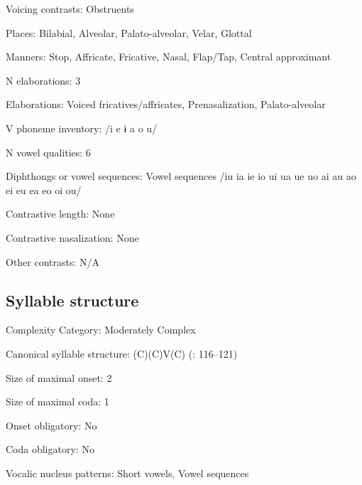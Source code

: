{\begin{appendixdesc}
\item[Voicing contrasts:] Obstruents

\item[Places:] Bilabial, Alveolar, Palato-alveolar, Velar, Glottal

\item[Manners:] Stop, Affricate, Fricative, Nasal, Flap/Tap, Central approximant

\item[N elaborations:] 3

\item[Elaborations:] Voiced fricatives/affricates, Prenasalization, Palato-alveolar

\item[V phoneme inventory:] /i e ɨ a o u/

\item[N vowel qualities:] 6

\item[Diphthongs or vowel sequences:] Vowel sequences /iu ia ie io ui ua ue uo ai au ao ei eu ea eo oi ou/

\item[Contrastive length:] None

\item[Contrastive nasalization:] None

\item[Other contrasts:] N/A
\end{appendixdesc}
\subsection*{Syllable structure}
\begin{appendixdesc}

\item[Complexity Category:] Moderately Complex

\item[Canonical syllable structure:] (C)(C)V(C) (\citealt{SandersSanders1980}: 116--121)

\item[Size of maximal onset:] 2

\item[Size of maximal coda:] 1

\item[Onset obligatory:] No

\item[Coda obligatory:] No

\item[Vocalic nucleus patterns:] Short vowels, Vowel sequences


\end{appendixdesc}}
